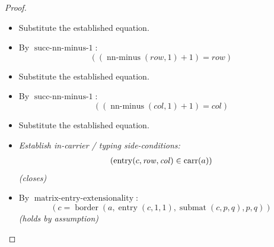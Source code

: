 \documentclass[11pt]{article}
\theoremstyle{plain}
\begin{document}
\begin{proof}
\begin{itemize}[leftmargin=2.8em, itemsep=4pt, parsep=1pt]
  \item[\textbf{78}] Substitute the established equation.
  \item[\textbf{79}] By $\operatorname{succ\text{-}nn\text{-}minus\text{-}1}$:
\begin{equation*}
((\operatorname{nn\text{-}minus}(\mathit{row}, 1) + 1) = \mathit{row})
\end{equation*}

  \item[\textbf{80}] Substitute the established equation.
  \item[\textbf{81}] By $\operatorname{succ\text{-}nn\text{-}minus\text{-}1}$:
\begin{equation*}
((\operatorname{nn\text{-}minus}(\mathit{col}, 1) + 1) = \mathit{col})
\end{equation*}

  \item[\textbf{82}] Substitute the established equation.
  \item[\textbf{83--84}] \emph{Establish in-carrier / typing side-conditions:}
\begin{equation*}
\begin{array}{@{}l@{}}
(\operatorname{entry}(c, \mathit{row}, \mathit{col}) \in \operatorname{carr}(a))
\end{array}
\end{equation*}
  \emph{(closes)}
  \item[\textbf{85--86}] By $\operatorname{matrix\text{-}entry\text{-}extensionality}$:
\begin{equation*}
(c = \operatorname{border}(a, \operatorname{entry}(c, 1, 1), \operatorname{submat}(c, p, q), p, q))
\end{equation*}
  \emph{(holds by assumption)}
\end{itemize}
\end{proof}
\end{document}
